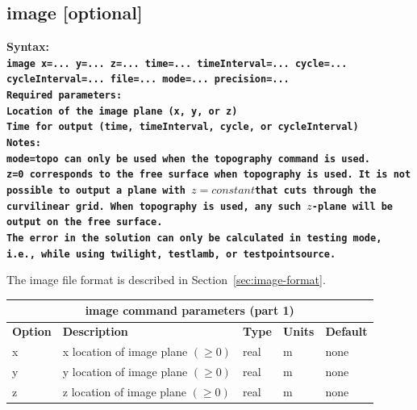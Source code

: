 \documentclass[11pt]{report}
\begin{document}
\subsection{image [optional]}
\label{keyword:image}
\begin{flushleft}
\bf Syntax:\\ \tt image x=... y=... z=...
time=... timeInterval=... cycle=... cycleInterval=... file=... mode=... precision=...\\ \bf Required
parameters:\\ \rm Location of the image plane (x, y, or z) \\ Time for output (time, timeInterval,
cycle, or cycleInterval)\\ \bf Notes: \\ \rm \verb+mode=topo+ can only be used when the
\verb+topography+ command is used.\\ \verb+z=0+ corresponds to the free surface when
\verb+topography+ is used. It is not possible to output a plane with $z=constant $that cuts through the
curvilinear grid. When \verb+topography+ is used, any such $z$-plane will be output on the free surface. \\ 
The error in the solution can only be calculated in testing mode, i.e.,
while using \verb+twilight+, \verb+testlamb+, or \verb+testpointsource+.
\end{flushleft}
%
The image file format is described in Section~\ref{sec:image-format}.
%
\begin{center}
\begin{tabular}{|l|p{8cm}|l|l|l|} \hline
\multicolumn{5}{|c|}{\bf image command parameters (part 1)}\\ \hline
\bf{Option} & \bf{Description}                             & \bf{Type} & \bf{Units} & \bf{Default} \\ 
\hline \hline
x          & x location of image plane  $(\geq 0)$    & real    & m        & none \\ \hline
y          & y location of image plane  $(\geq 0)$    & real    & m        & none \\ \hline
z          & z location of image plane  $(\geq 0)$    & real    & m        & none \\ \hline
\end{tabular}
\end{center}
\end{document}
